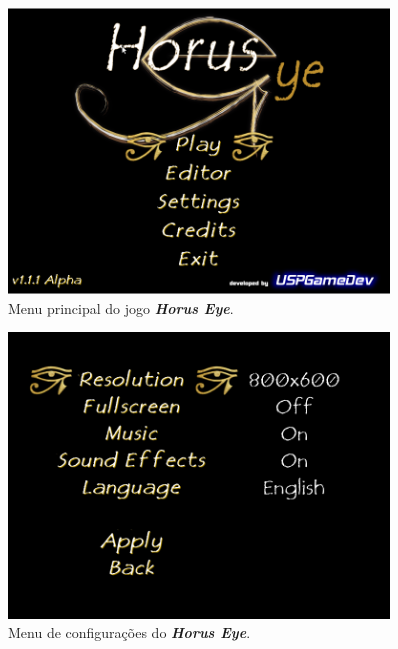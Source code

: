 \documentclass[12pt,onecolumn,a4paper]{article}
\begin{document}
        \begin{figure}[htb]
            \centering
            \includegraphics[width=0.9\textwidth]{images/horus_01.png}
            \caption{Menu principal do jogo \textit{\textbf{Horus Eye}}.}
            \label{fig:horus_01}
        \end{figure}
        
        \begin{figure}[htb]
            \centering
            \includegraphics[width=0.9\textwidth]{images/horus_02.png}
            \caption{Menu de configurações do \textit{\textbf{Horus Eye}}.}
            \label{fig:horus_02}
        \end{figure}
        
\end{document}
